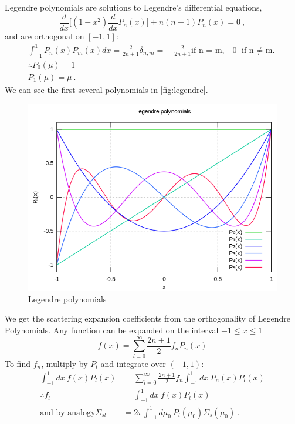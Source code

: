 \documentclass[12pt]{article}
\begin{document}
Legendre polynomials are solutions to Legendre's differential equations,
\[\frac{d}{dx}\bigl[(1 - x^2) \frac{d}{dx} P_n(x) \bigr] + n(n+1)P_n(x) = 0\:,\]
and are orthogonal on $[-1,1]$:
\begin{gather*}
\int_{-1}^{1}P_n(x)P_m(x)dx = 
\frac{2}{2n+1}\delta_{n,m}= \quad\frac{2}{2n+1}\text{if n = m,} \quad 0\text{ if n $\neq$ m.}\\
\therefore P_0(\mu) = 1 \\
P_1(\mu) = \mu\:.
\end{gather*}
%
We can see the first several polynomials in \autoref{fig:legendre}.
\begin{figure}[h!]
    \begin{center}
    \includegraphics[keepaspectratio, width = 3.5 in]{Legendrepolynomials}
    \end{center}
    \caption{Legendre polynomials}
    \label{fig:legendre}
\end{figure}

We get the scattering expansion coefficients from the orthogonality of Legendre Polynomials. Any function can be expanded on the interval $-1 \leq x \leq 1$
\[
f(x) = \sum_{l=0}^{\infty} \frac{2n+1}{2} f_n P_n(x)
\]
To find $f_n$, multiply by $P_l$ and integrate over $(-1,1)$:
\begin{align*}
\int_{-1}^1 dx\: f(x) P_l(x) &= \sum_{l=0}^{\infty} \frac{2n+1}{2} f_n\int_{-1}^1 dx\:  P_n(x) P_l(x)\\
\therefore f_l &= \int_{-1}^1 dx\: f(x) P_l(x)\\
\text{and by analogy}\Sigma_{sl} &= 2\pi \int_{-1}^1 d\mu_0 \: P_l(\mu_0)\Sigma_s(\mu_0)\:.
\end{align*}
\end{document}
